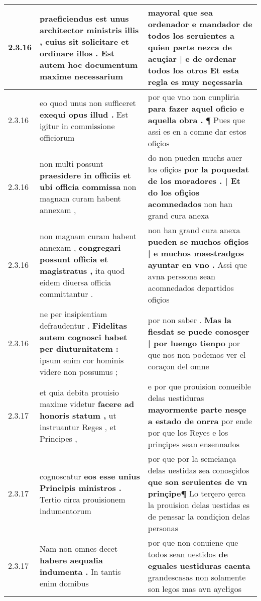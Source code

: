 \begin{tabular}{|p{1cm}|p{6.5cm}|p{6.5cm}|}
2.3.16 & praeficiendus est unus architector ministris illis , \textbf{ cuius sit solicitare et ordinare illos . } Est autem hoc documentum maxime necessarium & mayoral que sea ordenador e mandador de todos los seruientes \textbf{ a quien parte nezca de acuçiar | e de ordenar todos los otros } Et esta regla es muy neçessaria \\\hline
2.3.16 & eo quod unus non sufficeret \textbf{ exequi opus illud . } Est igitur in commissione officiorum & por que vno non cunpliria \textbf{ para fazer aquel oficio e aquella obra . } ¶ Pues que assi es en a comne dar estos ofiçios \\\hline
2.3.16 & non multi possunt \textbf{ praesidere in officiis et ubi officia commissa } non magnam curam habent annexam , & do non pueden muchs auer los ofiçios \textbf{ por la poquedat de los moradores . | Et do los ofiçios acomnedados } non han grand cura anexa \\\hline
2.3.16 & non magnam curam habent annexam , \textbf{ congregari possunt officia et magistratus , } ita quod eidem diuersa officia committantur . & non han grand cura anexa \textbf{ pueden se muchos ofiçios | e muchos maestradgos ayuntar en vno . } Assi que avna perssona sean acomnedados departidos ofiçios \\\hline
2.3.16 & ne per insipientiam defraudentur . \textbf{ Fidelitas autem cognosci habet per diuturnitatem : } ipsum enim cor hominis videre non possumus ; & por non saber . \textbf{ Mas la fiesdat se puede conosçer | por luengo tienpo } por que nos non podemos ver el coraçon del omne \\\hline
2.3.17 & et quia debita prouisio maxime videtur \textbf{ facere ad honoris statum , } ut instruantur Reges , et Principes , & e por que prouision conueible delas uestiduras \textbf{ mayormente parte nesçe a estado de onrra } por ende por que los Reyes e los prinçipes sean ensennados \\\hline
2.3.17 & cognoscatur \textbf{ eos esse unius Principis ministros . } Tertio circa prouisionem indumentorum & por que por la semeiança delas uestidas sea conosçidos \textbf{ que son seruientes de vn prinçipe¶ } Lo terçero çerca la prouision delas uestidas es de penssar la condiçion delas personas \\\hline
2.3.17 & Nam non omnes decet \textbf{ habere aequalia indumenta . } In tantis enim domibus & por que non conuiene que todos sean uestidos \textbf{ de eguales uestiduras caenta } grandescasas non solamente son legos mas avn aycłigos \\\hline

\end{tabular}
